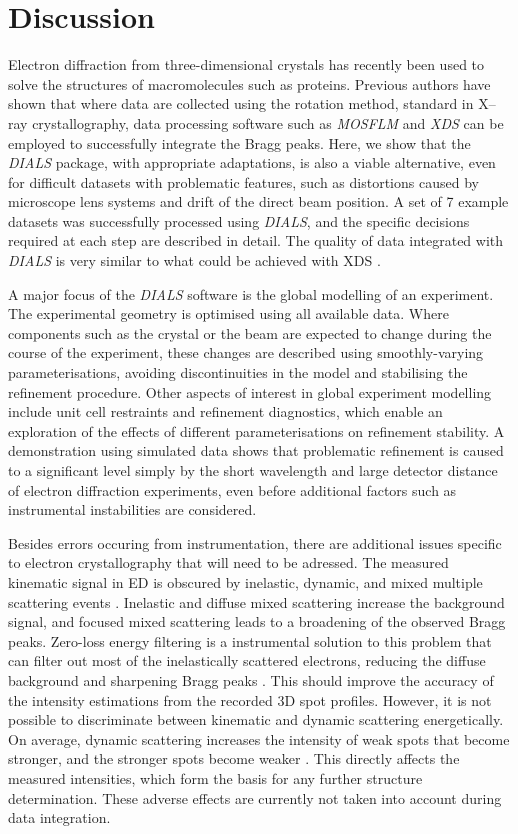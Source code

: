 \documentclass[preprint]{iucr}
\newcommand{\dials}{\emph{DIALS}\xspace}
\newcommand{\xds}{\emph{XDS}\xspace}
\newcommand{\mosflm}{\emph{MOSFLM}\xspace}
\begin{document}
\section{Discussion}

Electron diffraction from three-dimensional crystals has recently been used to
solve the structures of macromolecules such as proteins. Previous authors have
shown that where data are collected using the rotation method, standard in
X--ray crystallography, data processing software such as \mosflm and
\xds can be employed to successfully integrate the Bragg peaks. Here, we show
that the \dials package, with appropriate adaptations, is also a viable
alternative, even for difficult datasets with problematic features, such as
distortions caused by microscope lens systems and drift of the direct beam
position. A set of 7 example datasets was successfully processed using \dials,
and the specific decisions required at each step are described in detail. The
quality of data integrated with \dials is very similar to what could be achieved
with XDS \cite{Clabbers2017}.

A major focus of the \dials software is the global modelling of an experiment.
The experimental geometry is optimised using all available data. Where
components such as the crystal or the beam are expected to change during the
course of the experiment, these changes are described using smoothly-varying
parameterisations, avoiding discontinuities in the model and stabilising the
refinement procedure. Other aspects of interest in global experiment modelling
include unit cell restraints and refinement diagnostics, which enable an
exploration of the effects of different parameterisations on refinement
stability. A demonstration using simulated data shows that problematic
refinement is caused to a significant level simply by the short wavelength and
large detector distance of electron diffraction experiments, even before
additional factors such as instrumental instabilities are considered.

Besides errors occuring from instrumentation, there are additional issues
specific to electron crystallography that will need to be adressed.
The measured kinematic signal in ED is obscured by inelastic, dynamic, and mixed
multiple scattering events \cite{dorset:1995,zou:2011,Clabbers2018}.
Inelastic and diffuse mixed scattering increase
the background signal, and focused mixed scattering leads to a broadening
of the observed Bragg peaks. Zero-loss energy filtering is a instrumental
solution to this problem that can filter out most of the inelastically
scattered electrons, reducing the diffuse background and sharpening Bragg
peaks \cite{Yonekura2002}. This should improve the accuracy of the intensity
estimations from the recorded 3D spot profiles. However, it is not possible
to discriminate between kinematic and dynamic scattering energetically. On average,
dynamic scattering increases the intensity of weak spots that become stronger,
and the stronger spots become weaker \cite{Weirich2000}. This directly affects
the measured intensities, which form the basis for any further structure determination.
These adverse effects are currently not taken into account during data integration.
\end{document}
